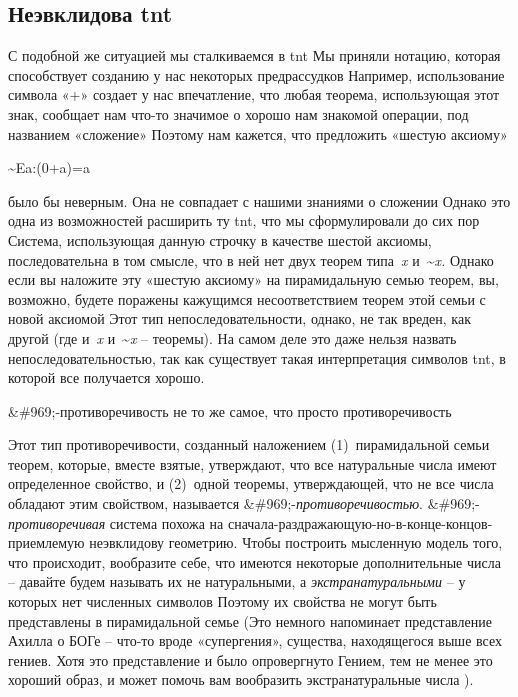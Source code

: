 \documentclass[../main.tex]{subfiles}
\begin{document}
\subsection{Неэвклидова \acs{tnt}}

С подобной же ситуацией мы сталкиваемся в \acs{tnt} Мы приняли нотацию, которая способствует созданию у нас некоторых предрассудков Например, использование символа «+» создает у нас впечатление, что любая теорема, использующая этот знак, сообщает нам что-то значимое о хорошо нам знакомой операции, под названием «сложение» Поэтому нам кажется, что предложить «шестую аксиому»

\textasciitilde Ea:(0+a)=a

было бы неверным. Она не совпадает с нашими знаниями о сложении Однако это одна из возможностей расширить ту \acs{tnt}, что мы сформулировали до сих пор Система, использующая данную строчку в качестве шестой аксиомы, последовательна в том смысле, что в ней нет двух теорем типа~\emph{x} и~\textasciitilde{}\emph{x.} Однако если вы наложите эту «шестую аксиому» на пирамидальную семью теорем, вы, возможно, будете поражены кажущимся несоответствием теорем этой семьи с новой аксиомой Этот тип непоследовательности, однако, не так вреден, как другой (где и~\emph{x} и~\textasciitilde{}\emph{x} \--- теоремы). На самом деле это даже нельзя назвать непоследовательностью, так как существует такая интерпретация символов \acs{tnt}, в которой все получается хорошо.

\&\#969;-противоречивость не то же самое, что просто противоречивость

Этот тип противоречивости, созданный наложением (1)~пирамидальной семьи теорем, которые, вместе взятые, утверждают, что все натуральные числа имеют определенное свойство, и (2)~одной теоремы, утверждающей, что не все числа обладают этим свойством, называется \&\#969;-\emph{противоречивостью}. \&\#969;-\emph{противоречивая} система похожа на сначала-раздражающую-но-в-конце-концов-приемлемую неэвклидову геометрию. Чтобы построить мысленную модель того, что происходит, вообразите себе, что имеются некоторые дополнительные числа \--- давайте будем называть их не натуральными, а \emph{экстранатуральными} \--- у которых нет численных символов Поэтому их свойства не могут быть представлены в пирамидальной семье (Это немного напоминает представление Ахилла о БОГе \--- что-то вроде «супергения», существа, находящегося выше всех гениев. Хотя это представление и было опровергнуто Гением, тем не менее это хороший образ, и может помочь вам вообразить экстранатуральные числа ).
\end{document}
